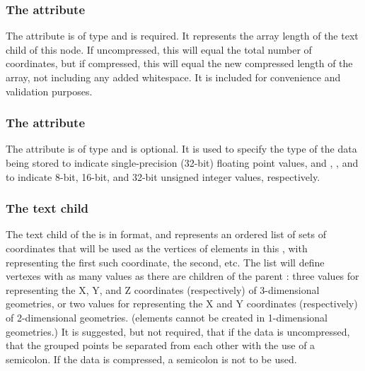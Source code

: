 
\subsubsection{The \fixttspace{} attribute}
The  attribute is of type  and is required. It represents the array length of the  text child of this node.  If uncompressed, this will equal the total number of coordinates, but if compressed, this will equal the new compressed length of the array, not including any added whitespace.  It is included for convenience and validation purposes.


\subsubsection{The \fixttspace{} attribute}
The  attribute is of type  and is optional.  It is used to specify the type of the data being stored  to indicate single-precision (32-bit) floating point values, and , , and  to indicate 8-bit, 16-bit, and 32-bit unsigned integer values, respectively.

\subsubsection{The \fixttspace{} text child}
The  text child of the \SpatialPoints is in  format, and represents an ordered list of sets of coordinates that will be used as the vertices of \ParametricObject elements in this \ParametricGeometry, with  representing the first such coordinate,  the second, etc.  The list will define vertexes with as many values as there are \CoordinateComponent children of the parent \Geometry:  three values for representing the X, Y, and Z coordinates (respectively) of 3-dimensional geometries, or two values for representing the X and Y coordinates (respectively) of 2-dimensional geometries.  (\ParametricGeometry elements cannot be created in 1-dimensional geometries.)  It is suggested, but not required, that if the data is uncompressed, that the grouped points be separated from each other with the use of a semicolon.  If the data is compressed, a semicolon is not to be used.

